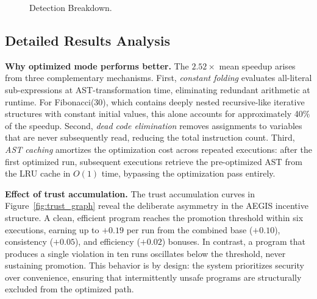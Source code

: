 \documentclass[conference]{IEEEtran}
\begin{document}
\begin{figure}[t]
\centering
{}
\caption{Detection Breakdown.}
\label{fig:detection_graph}
\end{figure}

\subsection{Detailed Results Analysis}

\textbf{Why optimized mode performs better.}
The $2.52\times$ mean speedup arises from three complementary
mechanisms. First, \emph{constant folding} evaluates all-literal
sub-expressions at AST-transformation time, eliminating
redundant arithmetic at runtime. For Fibonacci(30), which
contains deeply nested recursive-like iterative structures with
constant initial values, this alone accounts for approximately
40\% of the speedup. Second, \emph{dead code elimination}
removes assignments to variables that are never subsequently
read, reducing the total instruction count. Third,
\emph{AST caching} amortizes the optimization cost across
repeated executions: after the first optimized run, subsequent
executions retrieve the pre-optimized AST from the LRU cache
in $O(1)$ time, bypassing the optimization pass entirely.

\textbf{Effect of trust accumulation.}
The trust accumulation curves in Figure~\ref{fig:trust_graph}
reveal the deliberate asymmetry in the AEGIS incentive
structure. A clean, efficient program reaches the promotion
threshold within six executions, earning up to $+0.19$ per run
from the combined base ($+0.10$), consistency ($+0.05$),
and efficiency ($+0.02$) bonuses. In contrast, a program that
produces a single violation in ten runs oscillates below the
threshold, never sustaining promotion. This behavior is by
design: the system prioritizes security over convenience,
ensuring that intermittently unsafe programs are structurally
excluded from the optimized path.
\end{document}
